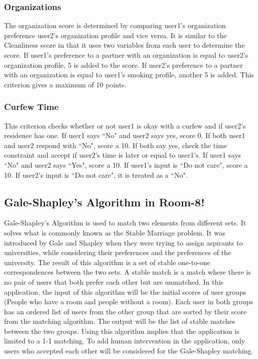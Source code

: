 \documentclass[journal]{IEEEtran}
\begin{document}
    \subsubsection{Organizations}
        The organization score is determined by comparing user1's organization preference user2's organization profile and vice versa.
        It is similar to the Cleanliness score in that it uses two variables from each user to determine the score.
        If user1's preference to a partner with an organization is equal to user2's organization profile, 5 is added to the score. If
        user2's preference to a partner with an organization is equal to user1's smoking profile, another 5 is added. This criterion gives a
        maximum of 10 points.

    \subsubsection{Curfew Time}
        This criterion checks whether or not user1 is okay with a curfew and if user2's residence has one. If user1 says
        ``No" and user2 says yes, score 0. If both user1 and user2 respond with ``No", score a 10. If both say yes,
        check the time constraint and accept if user2's time is later or equal to user1's. If user1 says ``No" and user2
        says ``Yes", score a 10. If user1's input is ``Do not care", score a 10. If user2's input is ``Do not care",
        it is treated as a ``No".

\subsection{Gale-Shapley's Algorithm in Room-8!}
Gale-Shapley's Algorithm is used to match two elements from different sets. It solves what is commonly known as the
Stable Marriage problem. It was introduced by Gale and Shapley when they were trying to assign aspirants to
universities, while considering their preferences and the preferences of the university\cite{irving}. The result of this
algorithm is a set of stable one-to-one correspondences between the two sets. A stable match is a match where there is
no pair of users that both prefer each other but are unmatched\cite{marriage}. In this application, the input of this
algorithm will be the initial scores of user groups (People who have a room and people without a room). Each user in
both groups has an ordered list of users from the other group that are sorted by their score from the matching
algorithm. The output will be the list of stable matches between the two groups. Using this algorithm implies that the
application is limited to a 1-1 matching. To add human intervention in the application, only users who accepted each
other will be considered for the Gale-Shapley matching.
\end{document}
